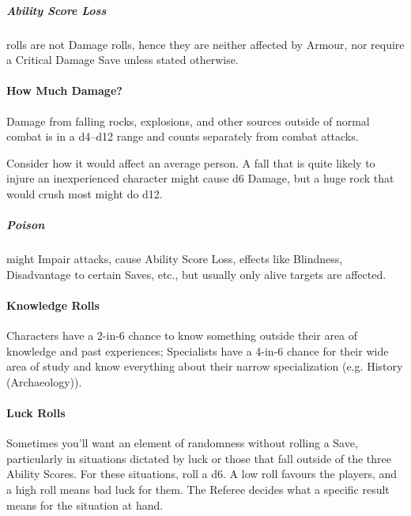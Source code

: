 \documentclass[itdr/core]{subfiles}
\begin{document}
\subparagraph{Ability Score Loss} rolls are not Damage rolls, hence they are neither affected by Armour, nor require a Critical Damage Save unless stated otherwise.

\vfill

\paragraph{How Much Damage?}
Damage from falling rocks, explosions, and other sources outside of normal combat is in a d4--d12 range and counts separately from combat attacks.

Consider how it would affect an average person. A fall that is quite likely to injure an inexperienced character might cause d6 Damage, but a huge rock that would crush most might do d12.

\subparagraph{Poison} might Impair attacks, cause Ability Score Loss, effects like Blindness, Disadvantage to certain Saves, etc., but usually only alive targets are affected.

\vfill

\paragraph{Knowledge Rolls}
Characters have a 2-in-6 chance to know something outside their area of knowledge and past experiences; Specialists have a 4-in-6 chance for their wide area of study and know everything about their narrow specialization (e.g. History (Archaeology)).

\vfill

\paragraph{Luck Rolls}
Sometimes you'll want an element of randomness without rolling a Save, particularly in situations dictated by luck or those that fall outside of the three Ability Scores. For these situations, roll a d6. A low roll favours the players, and a high roll means bad luck for them. The Referee decides what a specific result means for the situation at hand.

\vfill
\end{document}
